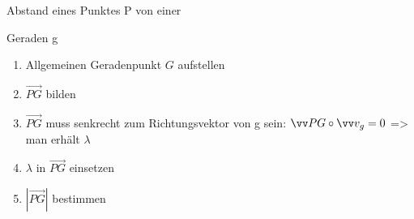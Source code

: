 \documentclass[paper=a6,landscape,ngerman,twoside=true,fontsize=12pt]{scrartcl}
\begin{document}
\begin{frage}
	\LARGE
	 Abstand eines Punktes P von einer 
	 
	 Geraden g
	
\end{frage}
\begin{antwort}
	\begin{enumerate} 
		\item Allgemeinen Geradenpunkt $G$ aufstellen
		\item $\vec{PG}$ bilden
		\item $\vec{PG}$ muss senkrecht zum Richtungsvektor von g sein: $\vec{PG} \mal \vec{v_g}=0$ => man erhält $\lambda$
		
		\item $\lambda$ in  $\vec{PG}$ einsetzen
		\item $|\vec{PG}|$ bestimmen
		
	\end{enumerate} 

	
\end{antwort}			
\end{document}
